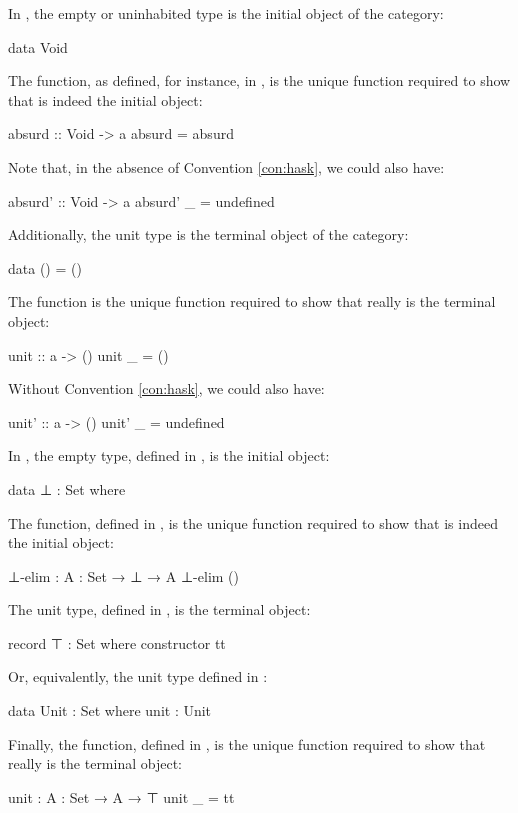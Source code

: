 \begin{example}
  \label{ex:initial-terminal-objects-haskell}

  In \hask, the empty or uninhabited type is the initial object of the
  category:
  \begin{codehaskell}
data Void
  \end{codehaskell}
  The  function, as defined, for instance, in
  \parencite{kmett-2012}, is the unique function required to show that
   is indeed the initial object:
  \begin{codehaskell}
absurd :: Void -> a
absurd = absurd
  \end{codehaskell}
  Note that, in the absence of Convention \ref{con:hask}, we could
  also have:
  \begin{codehaskell}
absurd' :: Void -> a
absurd' _ = undefined
  \end{codehaskell}
  Additionally, the unit type is the terminal object of the category:
  \begin{codehaskell}
data () = ()
  \end{codehaskell}
  The  function is the unique function required to
  show that \texthaskell{()} really is the terminal object:
  \begin{codehaskell}
unit :: a -> ()
unit _ = ()
  \end{codehaskell}
  Without Convention \ref{con:hask}, we could also have:
  \begin{codehaskell}
unit' :: a -> ()
unit' _ = undefined
  \end{codehaskell}

\end{example}

\begin{example}
  \label{ex:initial-terminal-objects-agda}

  In \agda, the empty type, defined in , is the
  initial object:
  \begin{codeagda}
data ⊥ : Set where
  \end{codeagda}
  The  function, defined in ,
  is the unique function required to show that  is indeed
  the initial object:
  \begin{codeagda}
⊥-elim : {A : Set} → ⊥ → A
⊥-elim ()
  \end{codeagda}
  The unit type, defined in , is the terminal
  object:
  \begin{codeagda}
record ⊤ : Set where
  constructor tt
  \end{codeagda}
  Or, equivalently, the unit type defined in :
  \begin{codeagda}
data Unit : Set where
  unit : Unit
  \end{codeagda}
  Finally, the  function, defined in
  , is the unique function required to show
  that  really is the terminal object:
  \begin{codeagda}
unit : {A : Set} → A → ⊤
unit _ = tt
  \end{codeagda}

\end{example}

